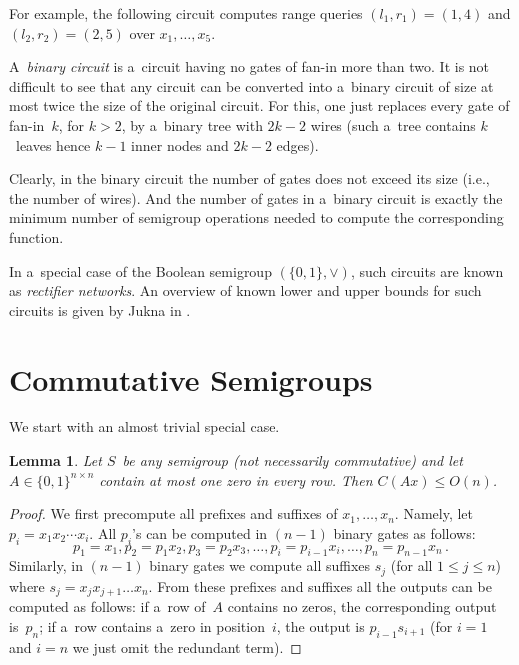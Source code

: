 \documentclass[11pt,letterpaper]{article}
\newtheorem{lemma}{Lemma}
\begin{document}
For example, the following circuit computes range queries $(l_1,r_1)=(1,4)$ and $(l_2,r_2)=(2,5)$ over $x_1, \dotsc, x_5$.
\begin{center}
\end{center}

A~{\em binary circuit} is a~circuit having no gates of fan-in more than two. It is not difficult to see that any circuit can be converted into a~binary circuit of size at most twice the size of the original circuit. For this, one just replaces every gate of fan-in~$k$, for $k>2$, by a~binary tree with $2k-2$ wires (such a~tree contains $k$~leaves hence $k-1$ inner nodes and $2k-2$ edges).

Clearly, in the binary circuit the number of gates does not exceed its size (i.e., the number of wires). And the number of gates in a~binary circuit is exactly the minimum number of semigroup operations needed to compute the corresponding function.

In a~special case of the Boolean semigroup $(\{0,1\}, \lor)$, such circuits are known as {\em rectifier networks}. An overview of known lower and upper bounds for such circuits is given by Jukna in \cite[Section~13.6]{DBLP:books/daglib/0028687}.




\section{Commutative Semigroups}

We start with an almost trivial special case.

\begin{lemma}
Let $S$~be {\em any} semigroup (not necessarily commutative) and let $A \in \{0,1\}^{n \times n}$ contain at most one zero in every row. Then $C(Ax) \le O(n)$.
\end{lemma}
\begin{proof}
We first precompute all prefixes and suffixes of $x_1, \dotsc, x_n$. Namely, let $p_i=x_1x_2\dotsb x_i$. All $p_i$'s can be computed in $(n-1)$ binary gates as follows:
\[p_1=x_1, p_2=p_1x_2, p_3=p_2x_3, \dotsc, p_i=p_{i-1}x_i, \dotsc, p_n=p_{n-1}x_n \, .\]
Similarly, in $(n-1)$ binary gates we compute all suffixes $s_j$ (for all $1 \le j \le n$) where $s_j=x_jx_{j+1}\dotsc x_n$. From these prefixes and suffixes all the outputs can be computed as follows: if a~row of~$A$ contains no zeros, the corresponding output is~$p_n$; if a~row contains a~zero in position~$i$, the output is $p_{i-1}s_{i+1}$ (for $i=1$ and $i=n$ we just omit the redundant term).
\end{proof}
\end{document}
